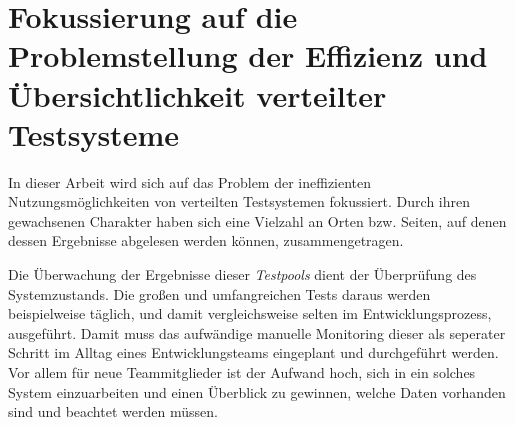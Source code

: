 \section{Fokussierung auf die Problemstellung der Effizienz und Übersichtlichkeit verteilter Testsysteme}
\label{ch:Problem:Fokus}


In dieser Arbeit wird sich auf das Problem der ineffizienten Nutzungsmöglichkeiten von verteilten Testsystemen fokussiert. Durch ihren gewachsenen Charakter haben sich eine Vielzahl an Orten bzw. Seiten, auf denen dessen Ergebnisse abgelesen werden können, zusammengetragen.

Die Überwachung der Ergebnisse dieser \textit{Testpools} dient der Überprüfung des Systemzustands. Die großen und umfangreichen Tests daraus werden beispielweise täglich, und damit vergleichsweise selten im Entwicklungsprozess, ausgeführt. Damit muss das aufwändige manuelle Monitoring dieser als seperater Schritt im Alltag eines Entwicklungsteams eingeplant und durchgeführt werden.
Vor allem für neue Teammitglieder ist der Aufwand hoch, sich in ein solches System einzuarbeiten und einen Überblick zu gewinnen, welche Daten vorhanden sind und beachtet werden müssen.
